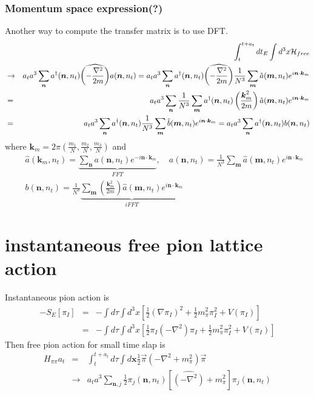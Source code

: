 \documentclass[10pt]{book}
\def\bm{\boldsymbol}
\newcommand{\bea}{\begin{eqnarray}}
\newcommand{\eea}{\end{eqnarray}}
\newcommand{\no}{\nonumber \\}
\def\vn{{\bm n}}
\def\vx{{\bm x}}
\begin{document}
\subsubsection{Momentum space expression(?)} 
Another way to compute the transfer matrix is to use DFT. 
\bea 
& &\int_{t}^{t+a_t} dt_E \int d^3 x {\cal H}_{free}\no 
&\to& a_t a^3\sum_{\bm n}a^\dagger({\bm n},n_t)\widehat{\left(-\frac{\nabla^2}{2m}\right) } a({\bm n},n_t)
=a_t a^3\sum_{\bm n}a^\dagger({\bm n},n_t)\widehat{\left(-\frac{\nabla^2}{2m}\right) } 
         \frac{1}{N^3}\sum_{{\bm m}} \hat{a}({\bm m},n_t) e^{i{\bm n}\cdot{\bm k_m}} \no 
&=& a_t a^3\sum_{\bm n}\frac{1}{N^3}\sum_{{\bm m}} 
 a^\dagger({\bm n},n_t)\left(\frac{\bm k_m^2}{2m}\right) \hat{a}({\bm m},n_t) e^{i{\bm n}\cdot{\bm k_m}} 
 \no          
 &=& a_t a^3\sum_{\bm n}a^\dagger({\bm n},n_t)
   \frac{1}{N^3}\sum_{{\bm m}} \hat{b}({\bm m},n_t) e^{i{\bm n}\cdot{\bm k_m}}
 = a_t a^3\sum_{\bm n}a^\dagger({\bm n},n_t) b({\bm n},n_t)
\eea 
where ${\bm k_m}=2\pi(\frac{m_1}{N},\frac{m_2}{N},\frac{m_3}{N})$ and 
\bea 
& &\hat{a}({\bm k_m},n_t)=\underbrace{\sum_{{\bm n}}a({\bm n},n_t)e^{-i{\bm n}\cdot{\bm k}_m}}_{FFT},\quad 
a({\bm n},n_t)=\frac{1}{N^3}\sum_{{\bm m}} \hat{a}({\bm m},n_t) e^{i{\bm n}\cdot{\bm k}_m} \no 
& &b({\bm n},n_t)=\frac{1}{N^3}\underbrace{\sum_{\bm m}\left(\frac{\bm k_m^2}{2m}\right) \hat{a}({\bm m},n_t)
                                e^{i{\bm n}\cdot{\bm k_m}} }_{iFFT}
\eea 



\section{instantaneous free pion lattice action}
Instantaneous pion action is
\bea 
-S_E[\pi_I]&=& -\int d\tau \int d^3 x \left[\frac{1}{2}(\nabla \pi_I)^2 
 +\frac{1}{2}m_\pi^2\pi_I^2+V(\pi_I)\right]  \no 
 &=& -\int d\tau \int d^3 x \left[\frac{1}{2} \pi_I (-\nabla^2) \pi_I+\frac{1}{2}m_\pi^2\pi_I^2+V(\pi_I)\right]                          
\eea 
Then free pion action for small time slap is
\bea 
H_{\pi\pi}a_t&=&  \int_{t}^{t+a_t}d\tau \int d\vx \frac{1}{2} {\vec\pi} (-\nabla^2+m_\pi^2){\vec\pi}\no 
 &\to & a_t a^3 \sum_{\vn,j}\frac{1}{2}\pi_j({\bm n},n_t)[\widehat{(-\nabla^2)}+m_\pi^2]\pi_j({\bm n},n_t)
\eea                
\end{document}
